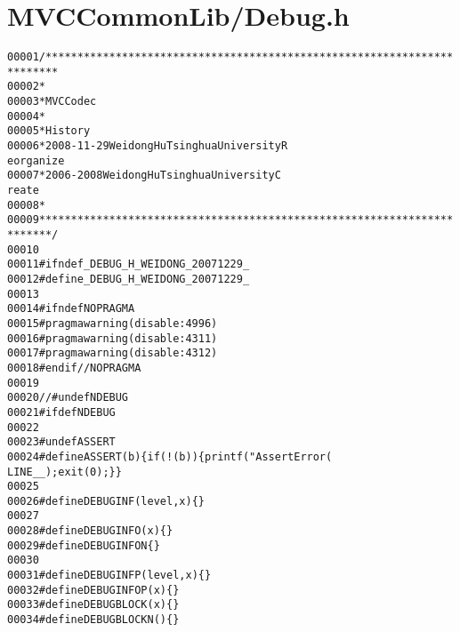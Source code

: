 \hypertarget{_debug_8h_source}{
\section{MVCCommonLib/Debug.h}
}


\begin{footnotesize}\begin{alltt}
00001 \textcolor{comment}{/************************************************************************}
00002 \textcolor{comment}{ *}
00003 \textcolor{comment}{ * MVC Codec}
00004 \textcolor{comment}{ * }
00005 \textcolor{comment}{ * History}
00006 \textcolor{comment}{ * 2008-11-29           Weidong Hu              Tsinghua University             R
      eorganize}
00007 \textcolor{comment}{ * 2006-2008            Weidong Hu              Tsinghua University             C
      reate}
00008 \textcolor{comment}{ * }
00009 \textcolor{comment}{ ************************************************************************/}
00010 
00011 \textcolor{preprocessor}{#ifndef \_DEBUG\_H\_WEIDONG\_20071229\_}
00012 \textcolor{preprocessor}{}\textcolor{preprocessor}{#define \_DEBUG\_H\_WEIDONG\_20071229\_}
00013 \textcolor{preprocessor}{}
00014 \textcolor{preprocessor}{#ifndef NOPRAGMA}
00015 \textcolor{preprocessor}{}\textcolor{preprocessor}{#pragma warning(disable:4996)}
00016 \textcolor{preprocessor}{}\textcolor{preprocessor}{#pragma warning(disable:4311)}
00017 \textcolor{preprocessor}{}\textcolor{preprocessor}{#pragma warning(disable:4312)}
00018 \textcolor{preprocessor}{}\textcolor{preprocessor}{#endif //NOPRAGMA}
00019 \textcolor{preprocessor}{}
00020 \textcolor{comment}{//#undef NDEBUG}
00021 \textcolor{preprocessor}{#ifdef NDEBUG}
00022 \textcolor{preprocessor}{}
00023 \textcolor{preprocessor}{#undef ASSERT}
00024 \textcolor{preprocessor}{}\textcolor{preprocessor}{#define ASSERT(b) \{ if (!(b)) \{ printf("Assert Error (%s,%d)!!!!\(\backslash\)n", \_\_FILE\_\_, \_\_
      LINE\_\_); exit(0); \} \}}
00025 \textcolor{preprocessor}{}
00026 \textcolor{preprocessor}{#define DEBUGINF(level, x) \{\}}
00027 \textcolor{preprocessor}{}
00028 \textcolor{preprocessor}{#define DEBUGINFO(x) \{\}}
00029 \textcolor{preprocessor}{}\textcolor{preprocessor}{#define DEBUGINFON \{\}}
00030 \textcolor{preprocessor}{}
00031 \textcolor{preprocessor}{#define DEBUGINFP(level, x) \{\}}
00032 \textcolor{preprocessor}{}\textcolor{preprocessor}{#define DEBUGINFOP(x) \{\}}
00033 \textcolor{preprocessor}{}\textcolor{preprocessor}{#define DEBUGBLOCK(x) \{\}}
00034 \textcolor{preprocessor}{}\textcolor{preprocessor}{#define DEBUGBLOCKN() \{\}}

\end{alltt}
\end{footnotesize}
